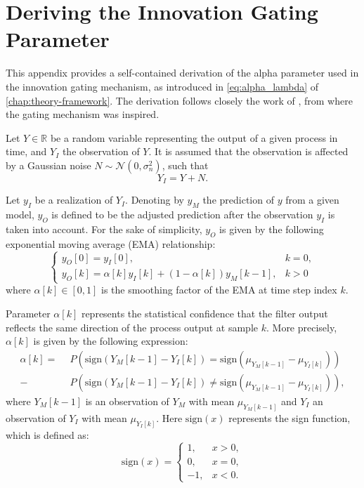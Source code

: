 \chapter{Deriving the Innovation Gating Parameter}
\label{chap:deriving-alpha}

This appendix provides a self-contained derivation of the alpha parameter 
used in the innovation gating mechanism, as introduced in \cref{eq:alpha_lambda} of \cref{chap:theory-framework}. 
The derivation follows closely the work of , from where the gating mechanism was inspired.

Let $Y \in \mathbb{R}$ be a random variable representing the output of a given process in time, and $Y_I$ the observation of $Y$.
It is assumed that the observation is affected by a Gaussian noise $N \sim \mathcal{N}(0, \sigma_n^2)$, such that
%
\begin{equation}
    Y_I = Y + N.
\end{equation}

Let $y_I$ be a realization of $Y_I$.
Denoting by $y_M$ the prediction of $y$ from a given model, 
$y_O$ is defined to be the adjusted prediction after the observation $y_I$ is taken into account.
For the sake of simplicity, $y_O$ is given by the following exponential moving average (EMA) relationship:
%
\begin{equation}
    \begin{cases}
        y_O[0] = y_I[0], & k = 0, \\
        y_O[k] = \alpha[k] y_I[k] + (1 - \alpha[k]) y_M[k-1], & k > 0
    \end{cases}
\end{equation}
%
where $\alpha[k] \in [0, 1]$ is the smoothing factor of the EMA at time step index $k$.

Parameter $\alpha[k]$ represents the statistical confidence that 
the filter output reflects the same direction of the process output at sample $k$. 
More precisely, $\alpha[k]$ is given by the following expression:
%
\begin{align}
    \alpha[k] = \ \
    &P(\mathrm{sign}(Y_M[k-1] - Y_I[k]) =    \mathrm{sign}(\mu_{Y_M[k-1]} - \mu_{Y_I[k]})) \nonumber\\ -
    &P(\mathrm{sign}(Y_M[k-1] - Y_I[k]) \neq \mathrm{sign}(\mu_{Y_M[k-1]} - \mu_{Y_I[k]})),
\label{eq:alpha}
\end{align}
%
where $Y_M[k-1]$ is an observation of $Y_M$ with mean $\mu_{Y_M[k-1]}$
and $Y_I$ an observation of $Y_I$ with mean $\mu_{Y_I[k]}$. 
Here $\mathrm{sign}(x)$ represents the sign function, which is defined as:
%
\begin{equation}
    \mathrm{sign}(x) =
    \begin{cases}
        1, & x > 0, \\
        0, & x = 0, \\
        -1, & x < 0.
    \end{cases}
\end{equation}

